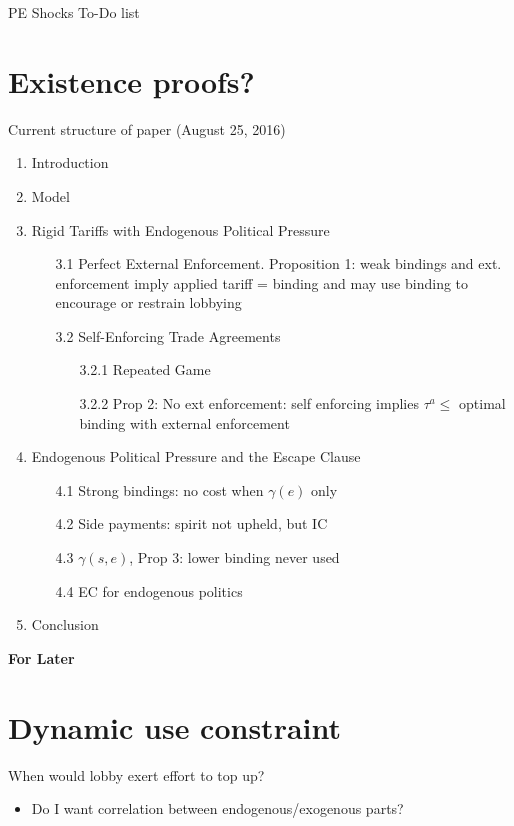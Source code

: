 \documentclass[12pt]{article}
\newcommand{\ga}{\gamma}
\begin{document}
\begin{center}
PE Shocks To-Do list
\end{center}



\section{Existence proofs?}





\newpage
Current structure of paper (August 25, 2016)
\begin{enumerate}
	\item Introduction
	\item Model
	\item Rigid Tariffs with Endogenous Political Pressure
		\begin{itemize}
			\item[3.1] Perfect External Enforcement. Proposition 1: weak bindings and ext. enforcement imply applied tariff = binding and may use binding to encourage or restrain lobbying
			\item[3.2] Self-Enforcing Trade Agreements
				\begin{itemize}
					\item[3.2.1] Repeated Game
					\item[3.2.2] Prop 2: No ext enforcement: self enforcing implies $\tau^a \leq$ optimal binding with external enforcement
				\end{itemize}
		\end{itemize}
	\item Endogenous Political Pressure and the Escape Clause
		\begin{itemize}
			\item[4.1] Strong bindings: no cost when $\ga(e)$ only
			\item[4.2] Side payments: spirit not upheld, but IC
			\item[4.3] $\ga(s,e)$, Prop 3: lower binding never used
			\item[4.4] EC for endogenous politics
		\end{itemize}
	\item Conclusion
\end{enumerate}


\newpage
\begin{center}
\textbf{\large{For Later}}
\end{center}

\section{Dynamic use constraint}
When would lobby exert effort to top up?
\begin{itemize}
	\item Do I want correlation between endogenous/exogenous parts? 
\end{itemize}
\end{document}
